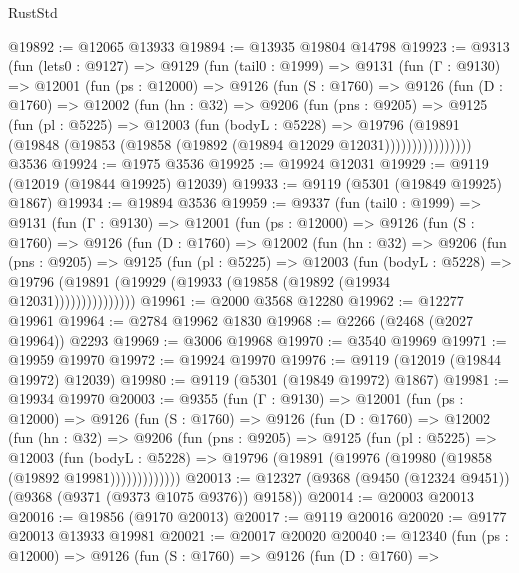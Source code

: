 \begin{lexlean}{RustStd}
\begin{coremodule}
@19892 := @12065 @13933
@19894 := @13935 @19804 @14798
@19923 := @9313
    (fun (lets0 : @9127) =>
    @9129
      (fun (tail0 : @1999) =>
      @9131
        (fun (Γ : @9130) =>
        @12001
          (fun (ps : @12000) =>
          @9126
            (fun (S : @1760) =>
            @9126
              (fun (D : @1760) =>
              @12002
                (fun (hn : @32) =>
                @9206
                  (fun (pns : @9205) =>
                  @9125
                    (fun (pl : @5225) =>
                    @12003
                      (fun (bodyL : @5228) =>
                      @19796
                        (@19891
                          (@19848 (@19853 (@19858 (@19892 (@19894 @12029 @12031))))))))))))))))
    @3536
@19924 := @1975 @3536
@19925 := @19924 @12031
@19929 := @9119 (@12019 (@19844 @19925) @12039)
@19933 := @9119 (@5301 (@19849 @19925) @1867)
@19934 := @19894 @3536
@19959 := @9337
    (fun (tail0 : @1999) =>
    @9131
      (fun (Γ : @9130) =>
      @12001
        (fun (ps : @12000) =>
        @9126
          (fun (S : @1760) =>
          @9126
            (fun (D : @1760) =>
            @12002
              (fun (hn : @32) =>
              @9206
                (fun (pns : @9205) =>
                @9125
                  (fun (pl : @5225) =>
                  @12003
                    (fun (bodyL : @5228) =>
                    @19796 (@19891 (@19929 (@19933 (@19858 (@19892 (@19934 @12031)))))))))))))))
@19961 := @2000 @3568 @12280
@19962 := @12277 @19961
@19964 := @2784 @19962 @1830
@19968 := @2266 (@2468 (@2027 @19964)) @2293
@19969 := @3006 @19968
@19970 := @3540 @19969
@19971 := @19959 @19970
@19972 := @19924 @19970
@19976 := @9119 (@12019 (@19844 @19972) @12039)
@19980 := @9119 (@5301 (@19849 @19972) @1867)
@19981 := @19934 @19970
@20003 := @9355
    (fun (Γ : @9130) =>
    @12001
      (fun (ps : @12000) =>
      @9126
        (fun (S : @1760) =>
        @9126
          (fun (D : @1760) =>
          @12002
            (fun (hn : @32) =>
            @9206
              (fun (pns : @9205) =>
              @9125
                (fun (pl : @5225) =>
                @12003
                  (fun (bodyL : @5228) =>
                  @19796 (@19891 (@19976 (@19980 (@19858 (@19892 @19981)))))))))))))
@20013 := @12327 (@9368 (@9450 (@12324 @9451)) (@9368 (@9371 (@9373 @1075 @9376)) @9158))
@20014 := @20003 @20013
@20016 := @19856 (@9170 @20013)
@20017 := @9119 @20016
@20020 := @9177 @20013 @13933 @19981
@20021 := @20017 @20020
@20040 := @12340
    (fun (ps : @12000) =>
    @9126
      (fun (S : @1760) =>
      @9126
        (fun (D : @1760) =>

\end{coremodule}
\end{lexlean}
